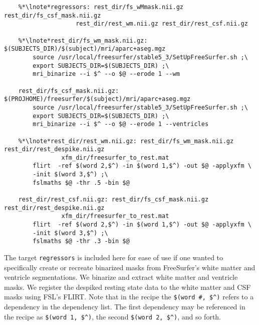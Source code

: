 \begin{lstlisting}
	%*\lnote*regressors: rest_dir/fs_wMmask.nii.gz rest_dir/fs_csf_mask.nii.gz 
					rest_dir/rest_wm.nii.gz rest_dir/rest_csf.nii.gz

	%*\lnote*rest_dir/fs_wm_mask.nii.gz: $(SUBJECTS_DIR)/$(subject)/mri/aparc+aseg.mgz
		source /usr/local/freesurfer/stable5_3/SetUpFreeSurfer.sh ;\
		export SUBJECTS_DIR=$(SUBJECTS_DIR) ;\
		mri_binarize --i $^ --o $@ --erode 1 --wm

	rest_dir/fs_csf_mask.nii.gz: $(PROJHOME)/freesurfer/$(subject)/mri/aparc+aseg.mgz
		source /usr/local/freesurfer/stable5_3/SetUpFreeSurfer.sh ;\
		export SUBJECTS_DIR=$(SUBJECTS_DIR) ;\
		mri_binarize --i $^ --o $@ --erode 1 --ventricles
		
	%*\lnote*rest_dir/rest_wm.nii.gz: rest_dir/fs_wm_mask.nii.gz rest_dir/rest_despike.nii.gz 
				xfm_dir/freesurfer_to_rest.mat
		flirt  -ref $(word 2,$^) -in $(word 1,$^) -out $@ -applyxfm \
		-init $(word 3,$^) ;\	
		fslmaths $@ -thr .5 -bin $@

	rest_dir/rest_csf.nii.gz: rest_dir/fs_csf_mask.nii.gz rest_dir/rest_despike.nii.gz 
				xfm_dir/freesurfer_to_rest.mat
		flirt  -ref $(word 2,$^) -in $(word 1,$^) -out $@ -applyxfm \
		-init $(word 3,$^) ;\
		fslmaths $@ -thr .3 -bin $@
\end{lstlisting}

 The target \texttt{regressors} is included here for ease of use if one wanted to specifically create or recreate binarized masks from FreeSurfer's white matter and ventricle segmentations.  We binarize and extract white matter and ventricle masks.  We register the despiked resting state data to the white matter and CSF masks using  FSL's FLIRT.  Note that in the recipe the \texttt{\$(word \#, \$\^{})} refers to a dependency in the dependency list. The first dependency may be referenced in the recipe as \texttt{\$(word 1, \$\^{})}, the second \texttt{\$(word 2, \$\^{})}, and so forth.

